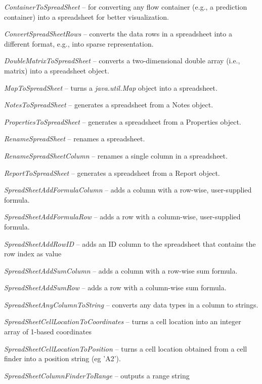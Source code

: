 \documentclass[a4paper]{book}
\begin{document}
\begin{tight_itemize}
	\item \textit{ContainerToSpreadSheet} -- for converting any flow container 
	(e.g., a prediction container) into a spreadsheet for better visualization.
	\item \textit{ConvertSpreadSheetRows} -- converts the data rows in a spreadsheet
	into a different format, e.g., into sparse representation.
	\item \textit{DoubleMatrixToSpreadSheet} -- converts a two-dimensional double
	array (i.e., matrix) into a spreadsheet object.
	\item \textit{MapToSpreadSheet} -- turns a \textit{java.util.Map} object
	into a spreadsheet.
	\item \textit{NotesToSpreadSheet} -- generates a spreadsheet from a Notes
	object.
	\item \textit{PropertiesToSpreadSheet} -- generates a spreadsheet from a 
	Properties object.
	\item \textit{RenameSpreadSheet} -- renames a spreadsheet.
	\item \textit{RenameSpreadSheetColumn} -- renames a single column in a 
	spreadsheet.
	\item \textit{ReportToSpreadSheet} -- generates a spreadsheet from a
	Report object.
	\item \textit{SpreadSheetAddFormulaColumn} -- adds a column with a row-wise,
	user-supplied formula.
	\item \textit{SpreadSheetAddFormulaRow} -- adds a row with a column-wise,  
	user-supplied formula.
	\item \textit{SpreadSheetAddRowID} -- adds an ID column to the spreadsheet
	that contains the row index as value
	\item \textit{SpreadSheetAddSumColumn} -- adds a column with a row-wise sum 
	formula.
	\item \textit{SpreadSheetAddSumRow} -- adds a row with a column-wise sum 
	formula.
	\item \textit{SpreadSheetAnyColumnToString} -- converts any data types in 
	a column to strings.
	\item \textit{SpreadSheetCellLocationToCoordinates} -- turns a cell location
	into an integer array of 1-based coordinates
	\item \textit{SpreadSheetCellLocationToPosition} -- turns a cell location
	obtained from a cell finder into a position string (eg 'A2').
	\item \textit{SpreadSheetColumnFinderToRange} -- outputs a range string

\end{tight_itemize}
\end{document}

